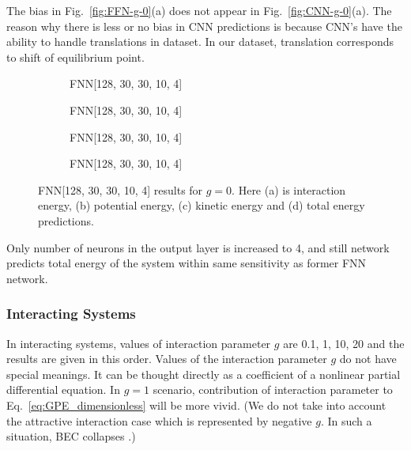 \documentclass[a4paper,times,12pt]{article}
\begin{document}
The bias in Fig.~\ref{fig:FFN-g-0}(a) does not appear in Fig.~\ref{fig:CNN-g-0}(a). The reason why there is less or no bias in CNN predictions is because CNN's have the ability to handle translations in dataset. In our dataset, translation corresponds to shift of equilibrium point. 

\begin{figure}[H]
    \centering
    \begin{subfigure}[t]{0.45\textwidth}
		\centering
        
        \caption{FNN[128, 30, 30, 10, 4]}
		\label{fig:a}
    \end{subfigure}
    \begin{subfigure}[t]{0.45\textwidth}
		\centering
        
        \caption{FNN[128, 30, 30, 10, 4]}
		\label{fig:b}
    \end{subfigure}    
    \begin{subfigure}[t]{0.45\textwidth}
        \centering
        
        \caption{FNN[128, 30, 30, 10, 4]}
		\label{fig:c}
    \end{subfigure}
    \begin{subfigure}[t]{0.45\textwidth}
        \centering
        
        \caption{FNN[128, 30, 30, 10, 4]}
		\label{fig:c}
    \end{subfigure}
	\caption{FNN[128, 30, 30, 10, 4] results for $g = 0$. Here (a) is interaction energy, (b) potential energy, (c) kinetic energy and (d) total energy predictions.}
\label{fig:FFN-g-0-S}
\end{figure}

Only number of neurons in the output layer is increased to 4, and still network predicts total energy of the system within same sensitivity as former FNN network.


\subsubsection{Interacting Systems}

In interacting systems, values of interaction parameter $g$ are 0.1, 1, 10, 20 and the results are given in this order. Values of the interaction parameter $g$ do not have special meanings. It can be thought directly as a coefficient of a nonlinear partial differential equation. In $g =1$ scenario, contribution of interaction parameter to Eq.~\ref{eq:GPE_dimensionless} will be more vivid. (We do not take into account the attractive interaction case which is represented by negative $g$. In such a situation, BEC collapses \cite{barenghi2016primer}.)
\end{document}

